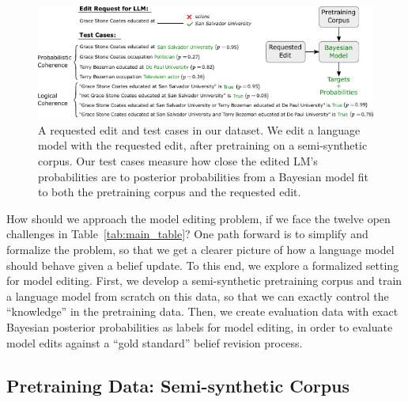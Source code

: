 \documentclass[11pt,a4paper]{article}
\begin{document}
\begin{figure}[!t]
   \centering
   \includegraphics[width=.99\textwidth]{figs/data-example.pdf}
   \vspace{-2pt}
   \caption{A requested edit and test cases in our dataset. We edit a language model with the requested edit, after pretraining on a semi-synthetic corpus. Our test cases measure how close the edited LM's probabilities are to posterior probabilities from a Bayesian model fit to both the pretraining corpus and the requested edit.}
   \vspace{-1pt}
   \label{fig:data_example}
\end{figure}

How should we approach the model editing problem, if we face the twelve open challenges in Table~\ref{tab:main_table}? One path forward is to simplify and formalize the problem, so that we get a clearer picture of how a language model should behave given a belief update.
To this end, we explore a formalized setting for model editing. First, we develop a semi-synthetic pretraining corpus and train a language model from scratch on this data, so that we can exactly control the ``knowledge'' in the pretraining data.
Then, we create evaluation data with exact Bayesian posterior probabilities as labels for model editing, in order to evaluate model edits against a ``gold standard'' belief revision process.

\subsection{Pretraining Data: Semi-synthetic Corpus}
\label{sec:pretraining_data}
\end{document}
